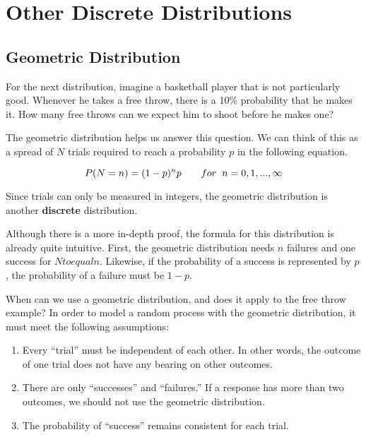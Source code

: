 \documentclass[
]{article}
\begin{document}
\hypertarget{Discrete}{%
\section{Other Discrete Distributions}\label{Discrete}}

\hypertarget{Geometric}{%
\subsection{Geometric Distribution}\label{Geometric}}

For the next distribution, imagine a basketball player that is not particularly good. Whenever he takes a free throw, there is a 10\% probability that he makes it. How many free throws can we expect him to shoot before he makes one?

The geometric distribution helps us answer this question. We can think of this as a spread of \(N\) trials required to reach a probability \(p\) in the following equation.

\[P(N = n) = (1-p)^{n} p \hspace{0.7cm}for\hspace{0.2cm} n=0,1,...,\infty\]

Since trials can only be measured in integers, the geometric distribution is another \textbf{discrete} distribution.

Although there is a more in-depth proof, the formula for this distribution is already quite intuitive. First, the geometric distribution needs \(n\) failures and one success for \(N to equal n\). Likewise, if the probability of a success is represented by \(p\), the probability of a failure must be \(1-p\).

When can we use a geometric distribution, and does it apply to the free throw example? In order to model a random process with the geometric distribution, it must meet the following assumptions:

\begin{enumerate}
\def\labelenumi{\arabic{enumi}.}
\item
  Every ``trial'' must be independent of each other. In other words, the outcome of one trial does not have any bearing on other outcomes.
\item
  There are only ``successes'' and ``failures.'' If a response has more than two outcomes, we should not use the geometric distribution.
\item
  The probability of ``success'' remains consistent for each trial.
\end{enumerate}
\end{document}

